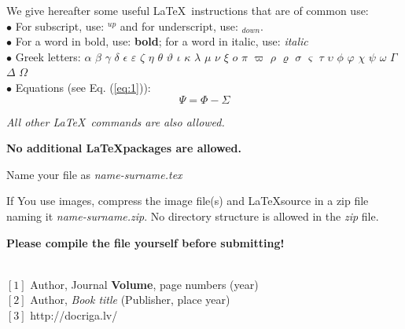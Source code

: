 \documentclass[10pt,a5paper]{article}
\begin{document}
\begin{small}
We give hereafter some useful \LaTeX~instructions that are of
common use:
\\
$\bullet$ For subscript, use: $^{up}$ and for underscript, use:
$_{down}$.
\\
$\bullet$ For a word in bold, use: \textbf{bold}; for a word in
italic, use: \textit{italic}
\\
$\bullet$ Greek letters: $\alpha$ $\beta$ $\gamma$ $\delta$
 $\epsilon$ $\varepsilon$ $\zeta$ $\eta$ $\theta$
$\vartheta$ $\iota$ $\kappa$ $\lambda$ $\mu$ $\nu$ $\xi$ $o$
$\pi$ $\varpi$ $\rho$ $\varrho$ $\sigma$ $\varsigma$ $\tau$
$\upsilon$ $\phi$ $\varphi$ $\chi$ $\psi$ $\omega$ $\Gamma$
$\Delta$ $\Omega$ %
\\
$\bullet$ Equations (see Eq. (\ref{eq:1})):
\begin{equation}
\Psi=\Phi-\Sigma
\label{eq:1}%
\end{equation}


\textit{All other \LaTeX~commands are also allowed.}

\textbf{No additional \LaTeX packages are allowed.}

Name your file as \textit{name-surname.tex}

If You use images, compress the image file(s) and \LaTeX source in a zip file naming it \textit{name-surname.zip}. No directory structure is allowed in the \textit{zip} file.

\textbf{Please compile the file yourself before submitting!}

\end{small}
{\begin{small}
\\
$[1]$ Author, Journal \textbf{Volume}, page numbers (year)\\ %
$[2]$ Author, \textit{Book title} (Publisher, place year)\\ %
$[3]$ http://docriga.lv/ %
\end{small}}
\end{document}
